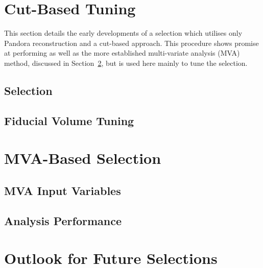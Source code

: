 \section{Cut-Based Tuning}\label{sec:FDCut}

This section details the early developments of a selection which utilises only Pandora reconstruction and a cut-based approach.  This procedure shows promise at performing as well as the more established multi-variate analysis (MVA) method, discussed in Section~\ref{sec:FDMVA}, but is used here mainly to tune the selection.

\subsection{Selection}\label{sec:FDCutSelection}

\subsection{Fiducial Volume Tuning}\label{sec:FDCutFV}

\section{MVA-Based Selection}\label{sec:FDMVA}

\subsection{MVA Input Variables}\label{sec:FDMVAVariables}

\subsection{Analysis Performance}\label{sec:FDMVAPerformance}

\section{Outlook for Future Selections}\label{sec:FDOutlook}

